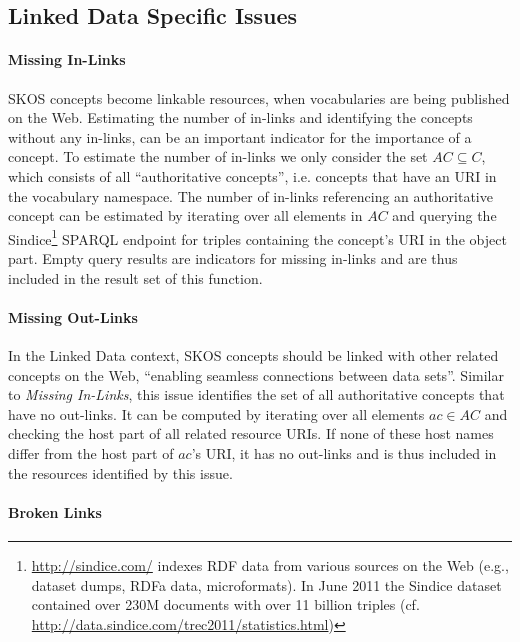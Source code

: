 \subsection{Linked Data Specific Issues}\label{subsec:ld_issues}

\paragraph{Missing In-Links}

SKOS concepts become linkable resources, when vocabularies are being published on the Web. Estimating the number of in-links and identifying the concepts without any in-links, can be an important indicator for the importance of a concept.
To estimate the number of in-links we only consider the set $AC \subseteq C$, which consists of all ``authoritative concepts'', i.e. concepts that have an URI in the vocabulary namespace. The number of in-links referencing an authoritative concept can be estimated by iterating over all elements in $AC$ and querying the Sindice\footnote{\url{http://sindice.com/} indexes RDF data from various sources on the Web (e.g., dataset dumps, RDFa data, microformats). In June 2011 the Sindice dataset contained over 230M documents with over 11 billion triples (cf. \url{http://data.sindice.com/trec2011/statistics.html})} SPARQL endpoint for triples containing the concept's URI in the object part. Empty query results are indicators for missing in-links and are thus included in the result set of this function.

\paragraph{Missing Out-Links}

In the Linked Data context, SKOS concepts should be linked with other related concepts on the Web, ``enabling seamless connections between data sets''\cite{Heath2011}. Similar to \emph{Missing In-Links}, this issue identifies the set of all authoritative concepts that have no out-links.
It can be computed by iterating over all elements $ac \in AC$ and checking the host part of all related resource URIs. If none of these host names differ from the host part of $ac$'s URI, it has no out-links and is thus included in the resources identified by this issue.

\paragraph{Broken Links}

